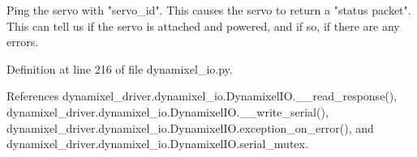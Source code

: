 \begin{DoxyVerb}Ping the servo with "servo_id". This causes the servo to return a
"status packet". This can tell us if the servo is attached and powered,
and if so, if there are any errors.
\end{DoxyVerb}
 

Definition at line 216 of file dynamixel\+\_\+io.\+py.



References dynamixel\+\_\+driver.\+dynamixel\+\_\+io.\+Dynamixel\+I\+O.\+\_\+\+\_\+read\+\_\+response(), dynamixel\+\_\+driver.\+dynamixel\+\_\+io.\+Dynamixel\+I\+O.\+\_\+\+\_\+write\+\_\+serial(), dynamixel\+\_\+driver.\+dynamixel\+\_\+io.\+Dynamixel\+I\+O.\+exception\+\_\+on\+\_\+error(), and dynamixel\+\_\+driver.\+dynamixel\+\_\+io.\+Dynamixel\+I\+O.\+serial\+\_\+mutex.


